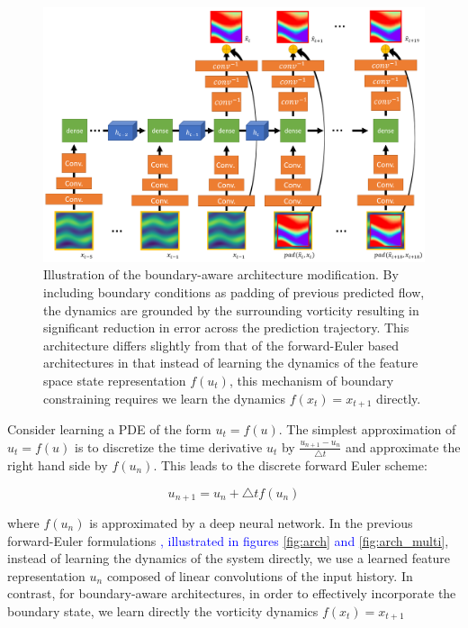 \documentclass[12pt]{article}
\theoremstyle{plain}
\theoremstyle{remark}
\theoremstyle{definition}
\begin{document}
\begin{figure}
	
	\centering
	\includegraphics[width=0.7\linewidth]{boundary_aware_arch}
	\caption{Illustration of the boundary-aware architecture modification. By including boundary conditions as padding of previous predicted flow, the dynamics are grounded by the surrounding vorticity resulting in significant reduction in error across the prediction trajectory. This architecture differs slightly from that of the forward-Euler based architectures in that instead of learning the dynamics of the feature space state representation $f(u_t)$, this mechanism of boundary constraining requires we learn the dynamics $f(x_t) = x_{t+1}$ directly.}
	\label{fig:boundry_aware_arch}
	
\end{figure}


Consider learning a PDE of the form $u_t = f(u)$. The simplest approximation of $u_t = f(u)$ is to discretize the time derivative $u_t$ by $\frac{u_{n+1} - u_n}{\bigtriangleup t}$ and approximate the right hand side by $f(u_n)$. This leads to the discrete forward Euler scheme:

$$u_{n+1} = u_n + \bigtriangleup t f(u_n) \label{eqn:ode} $$

where $f(u_n)$ is approximated by a deep neural network. In the previous forward-Euler formulations \textcolor{blue}{, illustrated in figures \ref{fig:arch} and \ref{fig:arch_multi}}, instead of learning the dynamics of the system directly, we use a learned feature representation $u_n$ composed of linear convolutions of the input history. In contrast, for boundary-aware architectures, in order to effectively incorporate the boundary state, we learn directly the vorticity dynamics $f(x_t) = x_{t+1}$ 
\end{document}
